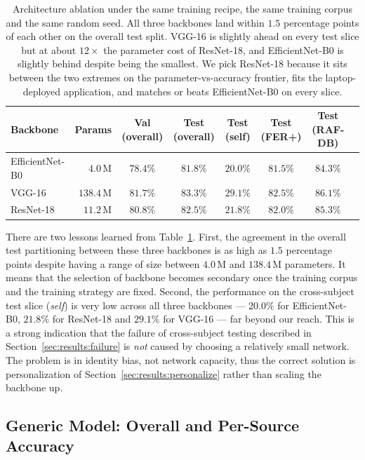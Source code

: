 \documentclass[12pt,a4paper]{article}
\begin{document}
\begin{table}[H]
  \centering
  \footnotesize
  \begin{tabular}{lrcccccc}
    \toprule
    Backbone   & Params         & Val (overall) & Test (overall) & Test (self) & Test (FER+) & Test (RAF-DB) \\
    \midrule
    EfficientNet-B0 & $4.0$\,M & $78.4\%$ & $81.8\%$ & $20.0\%$ & $81.5\%$ & $84.3\%$ \\
    VGG-16     & $138.4$\,M         & $81.7\%$ & $83.3\%$ & $29.1\%$ & $82.5\%$ & $86.1\%$ \\
    ResNet-18  & $\mathbf{11.2}$\,M & $80.8\%$ & $82.5\%$ & $21.8\%$ & $82.0\%$ & $85.3\%$ \\
    \bottomrule
  \end{tabular}
  \caption{\footnotesize Architecture ablation under the same training
  recipe, the same training corpus and the same random seed.
  All three backbones land within $1.5$ percentage points of
  each other on the overall test split. VGG-16 is slightly
  ahead on every test slice but at about $12\times$ the
  parameter cost of ResNet-18, and EfficientNet-B0 is slightly
  behind despite being the smallest. We pick ResNet-18 because
  it sits between the two extremes on the parameter-vs-accuracy
  frontier, fits the laptop-deployed application, and matches
  or beats EfficientNet-B0 on every slice.}
  \label{tab:archabl}
\end{table}

There are two lessons learned from Table~\ref{tab:archabl}. First,
the agreement in the overall test partitioning between these three
backbones is as high as $1.5$ percentage points despite having a
range of size between $4.0$\,M and $138.4$\,M parameters. It means
that the selection of backbone becomes secondary once the training
corpus and the training strategy are fixed. Second, the performance
on the cross-subject test slice (\emph{self}) is very low across
all three backbones --- $20.0\%$ for EfficientNet-B0, $21.8\%$ for
ResNet-18 and $29.1\%$ for VGG-16 --- far beyond our reach. This
is a strong indication that the failure of cross-subject testing
described in Section~\ref{sec:results:failure} is \emph{not} caused
by choosing a relatively small network. The problem is in identity
bias, not network capacity, thus the correct solution is
personalization of
Section~\ref{sec:results:personalize} rather than scaling the
backbone up.

\subsection{Generic Model: Overall and Per-Source Accuracy}
\label{sec:results:overall}
\end{document}
